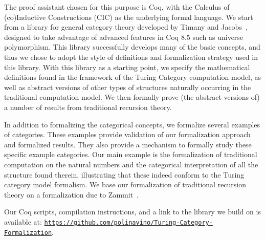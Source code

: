 \documentclass{entcs} \usepackage{entcsmacro}
\begin{document}
The proof assistant chosen for this purpose is Coq, with the Calculus
of (co)\-In\-duc\-tive Constructions (CIC) as the underlying formal
language.  We start from a library for general category theory
developed by Timany and Jacobs~\cite{timanyNewLib}, designed to take
advantage of advanced features in Coq 8.5 such as universe
polymorphism.  This library successfully develops many of the basic
concepts, and thus we chose to adopt the style of definitions and
formalization strategy used in this library.  With this library as a
starting point, we specify the mathematical definitions found in the
framework of the Turing Category computation model, as well
as abstract versions of other types of structures naturally
occurring in the traditional computation model.  We  then formally
prove (the abstract versions of) a number of results from
traditional recursion theory.


In addition to formalizing the categorical concepts, we formalize
several examples of categories. These examples provide validation
of our formalization approach and formalized results.  They also
provide a mechanism to formally study these specific example
categories. Our main example is the formalization of traditional
computation on the natural numbers and the categorical interpretation
of all the structure found therein, illustrating that these indeed
conform to the Turing category model formalism. We base our
formalization of traditional recursion theory on a formalization due
to Zammit~\cite{SmnForm}.

Our Coq scripts, compilation instructions, and a link to the library
we build on is available at:
\href{https://github.com/polinavino/Turing-Category-Formalization}
{\texttt{https://github.com/polinavino/Turing-Category-Formalization}}.
\end{document}
